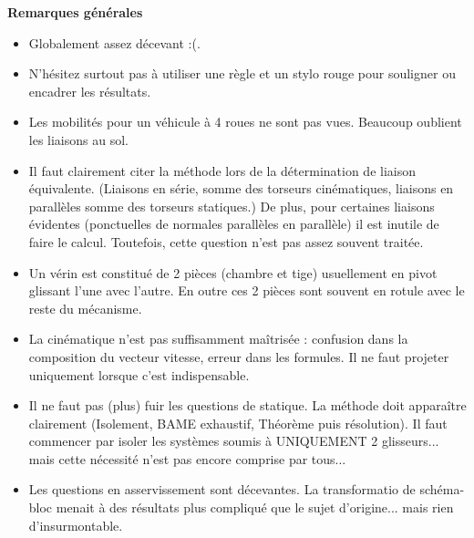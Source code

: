 \documentclass[10pt,fleqn]{article} %
\begin{document}
\vspace{6cm}
%
%
\textbf{Remarques générales}
\begin{itemize}
\item Globalement assez décevant :(.
\item N'hésitez surtout pas à utiliser une règle et un stylo rouge pour souligner ou encadrer les résultats. 
\item Les mobilités pour un véhicule à 4 roues ne sont pas vues. Beaucoup oublient les liaisons au sol.
\item Il faut clairement citer la méthode lors de la détermination de liaison équivalente. (Liaisons en série, somme des torseurs cinématiques, liaisons en parallèles somme des torseurs statiques.) De plus, pour certaines liaisons évidentes (ponctuelles de normales parallèles en parallèle) il est inutile de faire le calcul.
Toutefois, cette question n'est pas assez souvent traitée. 
\item Un vérin est constitué de 2 pièces (chambre et tige) usuellement en pivot glissant l'une avec l'autre. En outre ces 2 pièces sont souvent en rotule avec le reste du mécanisme.
\item La cinématique n'est pas suffisamment maîtrisée : confusion dans la composition du vecteur vitesse, erreur dans les formules. Il ne faut projeter uniquement lorsque c'est indispensable.
\item Il ne faut pas (plus) fuir les questions de statique. La méthode doit apparaître clairement (Isolement, BAME exhaustif, Théorème puis résolution). Il faut commencer par isoler les systèmes soumis à UNIQUEMENT  2 glisseurs... mais cette nécessité n'est pas encore comprise par tous...
\item Les questions en asservissement sont décevantes. La transformatio de schéma-bloc menait à des résultats plus compliqué que le sujet d'origine... mais rien d'insurmontable. 
\end{itemize}



%
\end{document}
